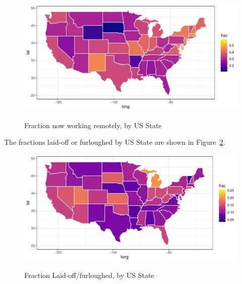\documentclass[12pt]{article}
\begin{document}

\begin{figure}
  \caption{Fraction now working remotely, by US State} \label{fig:geo_wfh}
\centering
\begin{minipage}{1.0 \linewidth}
  \includegraphics[width = \linewidth]{plots/geo_wfh.pdf} \\
  \begin{footnotesize}
    \end{footnotesize}
\end{minipage}
\end{figure} 

The fractions laid-off or furloughed by US State are shown in Figure~\ref{fig:geo_laidoff}.

\begin{figure}
  \caption{Fraction Laid-off/furloughed, by US State} \label{fig:geo_laidoff}
\centering
\begin{minipage}{1.0 \linewidth}
  \includegraphics[width = \linewidth]{plots/geo_laidoff.pdf} \\
  \begin{footnotesize}
    \end{footnotesize}
\end{minipage}
\end{figure} 
\end{document}
